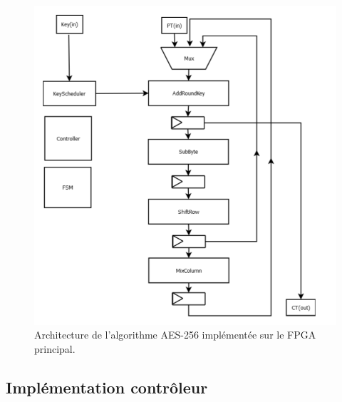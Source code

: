 \documentclass[oneside]{book}
\begin{document}
\begin{figure}[htbp]
    \centering
    \includegraphics[scale=1]{image/FPGA_arch}
    \caption{Architecture de l'algorithme AES-256 implémentée sur le FPGA principal.}
    \label{fig:FPGA_arch} 
\end{figure}


\subsection{Implémentation contrôleur}
\label{sec:Imp_contrôleur}
\end{document}
